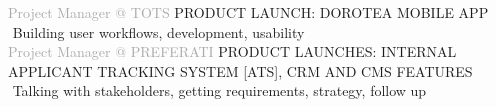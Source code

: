 \begin{cvtable}
{\textcolor{darkgray}{Project Manager \newline @ TOTS}}%
{
}%
{%
    {\scriptsize PRODUCT LAUNCH: DOROTEA MOBILE APP} \\
     \textperiodcentered $ $ %
     Building
    user workflows, development,
    usability %
    \\
}
% 
% 
{\textcolor{darkgray}{%
Project Manager
\newline
@
{P\scriptsize REFERATI}
}}%
{
}%
{%
    {\scriptsize PRODUCT LAUNCHES:
    INTERNAL APPLICANT TRACKING SYSTEM [ATS], %
    CRM AND CMS FEATURES
    } \\
     \textperiodcentered $ $ Talking with stakeholders, %
     getting requirements, strategy, follow up \\  %
}
\end{cvtable}
